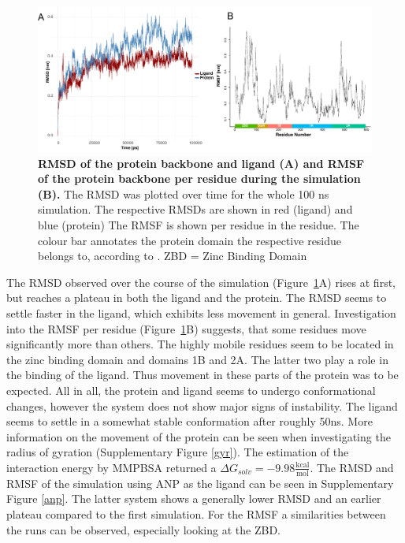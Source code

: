 \documentclass[11pt, letterpaper, titlepage]{article}
\begin{document}
\begin{figure}[h]
  \begin{center}
    \includegraphics[width=1.0\textwidth]{RMSD_RMSF_combined.pdf}
  \end{center}
  \caption{\textbf{RMSD of the protein backbone and ligand (A) and RMSF of the protein backbone per residue during the simulation (B).} The RMSD was plotted over time for the whole 100 ns simulation. The respective RMSDs are shown in red (ligand) and blue (protein) The RMSF is shown per residue in the residue. The colour bar annotates the protein domain the respective residue belongs to, according to \textcite{Domains}. ZBD = Zinc Binding Domain}
  \label{rms}
\end{figure}
The \ac{RMSD} observed over the course of the simulation (Figure~\ref{rms}A) rises at first, but reaches a plateau in both the ligand and the protein. The RMSD seems to settle faster in the ligand, which exhibits less movement in general. Investigation into the RMSF per residue (Figure~\ref{rms}B) suggests, that some residues move significantly more than others. The highly mobile residues seem to be located in the zinc binding domain and domains 1B and 2A. The latter two play a role in the binding of the ligand. Thus movement in these parts of the protein was to be expected. All in all, the protein and ligand seems to undergo conformational changes, however the system does not show major signs of instability. The ligand seems to settle in a somewhat stable conformation after roughly 50ns. More information on the movement of the protein can be seen when investigating the radius of gyration (Supplementary Figure \ref{gyr}). The estimation of the interaction energy by MMPBSA returned a $\Delta G_{solv} = -9.98 \frac{\textrm{kcal}}{\textrm{mol}}$. The RMSD and RMSF of the simulation using ANP as the ligand can be seen in Supplementary Figure \ref{anp}. The latter system shows a generally lower RMSD and an earlier plateau compared to the first simulation. For the RMSF a similarities between the runs can be observed, especially looking at the ZBD. 
\end{document}
